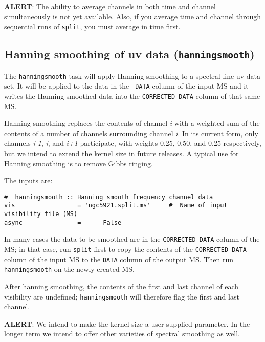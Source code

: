 {\bf ALERT}: The ability to average channels in both time and
channel simultaneously is not yet available.  Also, if you average
time and channel through sequential runs of {\tt split}, you must
average in time first.

\subsection{Hanning smoothing of uv data ({\tt hanningsmooth})}
\label{section:cal.other.hanningsmooth}

The {\tt hanningsmooth} task will apply Hanning smoothing to a
spectral line uv data set.  It will be applied to the data in the {\tt
DATA} column of the input MS and it writes the Hanning smoothed data
into the {\tt CORRECTED\_DATA} column of that same MS.

Hanning smoothing replaces the contents of channel {\it i} with a
weighted sum of the contents of a number of channels surrounding
channel {\it i}.  In its current form, only channels {\it i-1}, {\it
i}, and {\it i+1} participate, with weights 0.25, 0.50, and 0.25
respectively, but we intend to extend the kernel size in future
releases.  A typical use for Hanning smoothing is to remove Gibbs
ringing.

The inputs are:

\small
\begin{verbatim}
#  hanningsmooth :: Hanning smooth frequency channel data
vis                 = 'ngc5921.split.ms'     #  Name of input visibility file (MS)
async               =      False        
\end{verbatim}
\normalsize

In many cases the data to be smoothed are in the {\tt CORRECTED\_DATA}
column of the MS; in that case, run {\tt split} first to copy the
contents of the {\tt CORRECTED\_DATA} column of the input MS to the
{\tt DATA} column of the output MS.  Then run {\tt hanningsmooth} on
the newly created MS.

After hanning smoothing, the contents of the first and last channel of
each visibility are undefined; {\tt hanningsmooth} will therefore flag
the first and last channel.

{\bf ALERT}: We intend to make the kernel size a user supplied
parameter.  In the longer term we intend to offer other varieties of
spectral smoothing as well.


